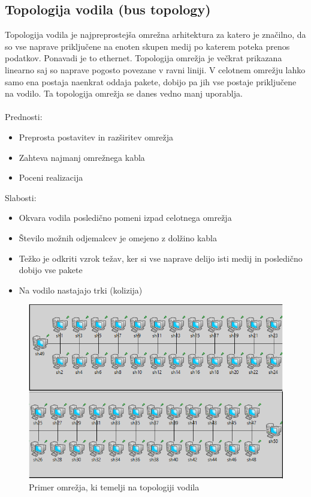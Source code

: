 \documentclass[11pt,a4paper,slovene]{myarticle}
\begin{document}
\subsection{Topologija vodila (bus topology)}
Topologija vodila je najpreprostejša omrežna arhitektura za katero je značilno, da so vse naprave priključene na enoten skupen medij po katerem poteka prenos podatkov. Ponavadi je to ethernet. Topologija omrežja je večkrat prikazana linearno saj so naprave pogosto povezane v ravni liniji. V celotnem omrežju lahko samo ena postaja naenkrat oddaja pakete, dobijo pa jih vse postaje priključene na vodilo. Ta topologija omrežja se danes vedno manj uporablja.
\\
\\
Prednosti:
\begin{itemize}
\item Preprosta postavitev in razširitev omrežja
\item Zahteva najmanj omrežnega kabla
\item Poceni realizacija
\end{itemize}
\pagebreak
Slabosti:
\begin{itemize}
\item Okvara vodila posledično pomeni izpad celotnega omrežja
\item Število možnih odjemalcev je omejeno z dolžino kabla
\item Težko je odkriti vzrok težav, ker si vse naprave delijo isti medij in posledično dobijo vse pakete
\item Na vodilo nastajajo trki (kolizija)
\end{itemize}
\begin{figure}[H]
\includegraphics[scale=0.75]{slike/bus.png}
\caption{Primer omrežja, ki temelji na topologiji vodila}
\end{figure}
\end{document}

